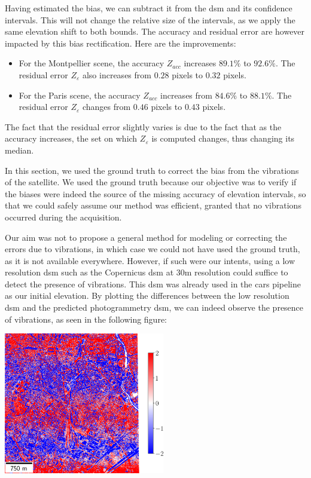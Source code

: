 Having estimated the bias, we can subtract it from the \acrshort{dsm} and its confidence intervals. This will not change the relative size of the intervals, as we apply the same elevation shift to both bounds. The accuracy and residual error are however impacted by this bias rectification. Here are the improvements:
\begin{itemize}
    \item For the Montpellier scene, the accuracy $Z_{acc}$ increases $89.1\%$ to $92.6\%$. The residual error $Z_\varepsilon$ also increases from $0.28$ pixels to $0.32$ pixels.
    \item For the Paris scene, the accuracy $Z_{acc}$ increases from $84.6\%$ to $88.1\%$. The residual error $Z_\varepsilon$ changes from $0.46$ pixels to $0.43$ pixels.  
\end{itemize}
The fact that the residual error slightly varies is due to the fact that as the accuracy increases, the set on which $Z_\varepsilon$ is computed changes, thus changing its median.

\begin{remark}
    In this section, we used the ground truth to correct the bias from the vibrations of the satellite. We used the ground truth because our objective was to verify if the biases were indeed the source of the missing accuracy of elevation intervals, so that we could safely assume our method was efficient, granted that no vibrations occurred during the acquisition. 
    
    Our aim was not to propose a general method for modeling or correcting the errors due to vibrations, in which case we could not have used the ground truth, as it is not available everywhere. However, if such were our intents, using a low resolution \acrshort{dsm} such as the Copernicus \acrshort{dsm} at 30m resolution could suffice to detect the presence of vibrations. This \acrshort{dsm} was already used in the \acrshort{cars} pipeline as our initial elevation. By plotting the differences between the low resolution \acrshort{dsm} and the predicted photogrammetry \acrshort{dsm}, we can indeed observe the presence of vibrations, as seen in the following figure:
    
    {\centering\includegraphics[width=7cm]{Images/Chap_6/copernicus_bias_Montpellier.png}
    }
\end{remark}


